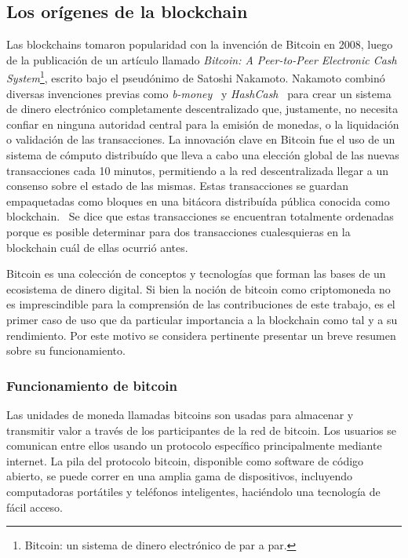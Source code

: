 \subsection{Los orígenes de la blockchain}
Las blockchains tomaron popularidad con la invención de Bitcoin en 2008, luego de la publicación
de un artículo llamado \textit{Bitcoin: A Peer-to-Peer
Electronic Cash System}\footnote{Bitcoin: un sistema de dinero electrónico de par a par.}, escrito
bajo el pseudónimo de Satoshi Nakamoto.
Nakamoto combinó diversas invenciones previas como
\textit{b-money}~\cite{b.money} y \textit{HashCash}~\cite{hashcash} para crear un sistema de dinero electrónico completamente
descentralizado que, justamente, no necesita confiar en ninguna autoridad central para la emisión de monedas,
o la liquidación o validación de las transacciones. 
La innovación clave en Bitcoin fue el uso de un sistema de cómputo distribuído que lleva
a cabo una elección global de las nuevas transacciones cada 10 minutos, permitiendo
a la red descentralizada llegar a un consenso sobre el estado de las mismas. Estas transacciones
se guardan empaquetadas como bloques en una bitácora distribuída pública conocida como blockchain.~\cite{mastering.bitcoin}
%
Se dice que estas transacciones se encuentran totalmente ordenadas porque es posible determinar para
dos transacciones cualesquieras en la blockchain cuál de ellas ocurrió antes.


Bitcoin es una colección de conceptos y tecnologías que forman las bases de un ecosistema de dinero
digital.
%
Si bien la noción de bitcoin como criptomoneda no es imprescindible para la comprensión de las
contribuciones de este trabajo, es el primer caso de uso que da particular importancia a la blockchain
como tal y a su rendimiento. Por este motivo se considera pertinente presentar un breve resumen sobre
su funcionamiento.

\subsubsection{Funcionamiento de bitcoin}

Las unidades de moneda llamadas bitcoins son usadas para almacenar y transmitir valor a través
de los participantes de la red de bitcoin. Los usuarios se comunican entre ellos usando un protocolo 
específico principalmente mediante internet. La pila del
protocolo bitcoin, disponible como software de código abierto, se puede correr en una amplia gama de
dispositivos, incluyendo computadoras portátiles y teléfonos inteligentes, haciéndolo una tecnología
de fácil acceso.

